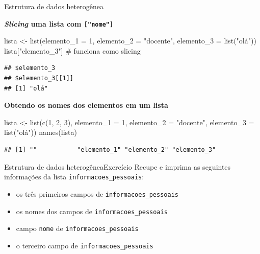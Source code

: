 \documentclass[
  10pt,
  ignorenonframetext,
]{beamer}
\newenvironment{Shaded}{}{}
\newcommand{\CommentTok}[1]{\textcolor[rgb]{0.00,0.50,0.00}{#1}}
\newcommand{\DataTypeTok}[1]{#1}
\newcommand{\DecValTok}[1]{#1}
\newcommand{\KeywordTok}[1]{\textcolor[rgb]{0.00,0.00,1.00}{#1}}
\newcommand{\NormalTok}[1]{#1}
\newcommand{\StringTok}[1]{\textcolor[rgb]{0.00,0.50,0.50}{#1}}
\providecommand{\tightlist}{%
  \setlength{\itemsep}{0pt}\setlength{\parskip}{0pt}}
\begin{document}
\begin{frame}[fragile]{Estrutura de dados heterogênea}
\protect\hypertarget{estrutura-de-dados-heteroguxeanea-5}{}
\small

\textbf{\emph{Slicing} uma lista com \texttt{{[}"nome"{]}}}

\begin{Shaded}
\begin{Highlighting}[]
\NormalTok{lista \textless{}{-}}\StringTok{ }\KeywordTok{list}\NormalTok{(}\DataTypeTok{elemento\_1 =} \DecValTok{1}\NormalTok{, }\DataTypeTok{elemento\_2 =} \StringTok{"docente"}\NormalTok{,}
          \DataTypeTok{elemento\_3 =} \KeywordTok{list}\NormalTok{(}\StringTok{"olá"}\NormalTok{))}
\NormalTok{lista[}\StringTok{"elemento\_3"}\NormalTok{] }\CommentTok{\# funciona como slicing}
\end{Highlighting}
\end{Shaded}

\begin{verbatim}
## $elemento_3
## $elemento_3[[1]]
## [1] "olá"
\end{verbatim}

\textbf{Obtendo os nomes dos elementos em um lista}

\begin{Shaded}
\begin{Highlighting}[]
\NormalTok{lista \textless{}{-}}\StringTok{ }\KeywordTok{list}\NormalTok{(}\KeywordTok{c}\NormalTok{(}\DecValTok{1}\NormalTok{, }\DecValTok{2}\NormalTok{, }\DecValTok{3}\NormalTok{), }\DataTypeTok{elemento\_1 =} \DecValTok{1}\NormalTok{, }\DataTypeTok{elemento\_2 =} \StringTok{"docente"}\NormalTok{,}
              \DataTypeTok{elemento\_3 =} \KeywordTok{list}\NormalTok{(}\StringTok{"olá"}\NormalTok{))}
\KeywordTok{names}\NormalTok{(lista)}
\end{Highlighting}
\end{Shaded}

\begin{verbatim}
## [1] ""           "elemento_1" "elemento_2" "elemento_3"
\end{verbatim}

\normalsize
\end{frame}

\begin{frame}[fragile]{Estrutura de dados heterogênea\newline Exercício}
\protect\hypertarget{estrutura-de-dados-heteroguxeaneaexercuxedcio-2}{}
Recupe e imprima as seguintes informações da lista
\texttt{informacoes\_pessoais}:

\begin{itemize}
\tightlist
\item
  os três primeiros campos de \texttt{informacoes\_pessoais}
\item
  os nomes dos campos de \texttt{informacoes\_pessoais}
\item
  campo \texttt{nome} de \texttt{informacoes\_pessoais}
\item
  o terceiro campo de \texttt{informacoes\_pessoais}
\end{itemize}
\end{frame}
\end{document}
